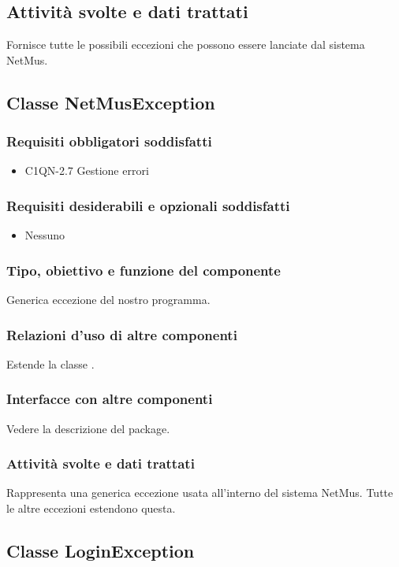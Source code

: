 \subsection*{Attivit\`a svolte e dati trattati}
Fornisce tutte le possibili eccezioni che possono essere lanciate dal sistema
NetMus.

\subsection{Classe NetMusException}
\subsubsection*{Requisiti obbligatori soddisfatti}
\begin{itemize}
	\item C1QN-2.7 Gestione errori
\end{itemize}
\subsubsection*{Requisiti desiderabili e opzionali soddisfatti}
\begin{itemize}
    \item Nessuno
\end{itemize}
\subsubsection*{Tipo, obiettivo e funzione del componente}
Generica eccezione del nostro programma.
\subsubsection*{Relazioni d'uso di altre componenti}
Estende la classe .
\subsubsection*{Interfacce con altre componenti}
Vedere la descrizione del package.
\subsubsection*{Attivit\`a svolte e dati trattati}
Rappresenta una generica eccezione usata all'interno del sistema NetMus. Tutte
le altre eccezioni estendono questa.

\subsection{Classe LoginException}
